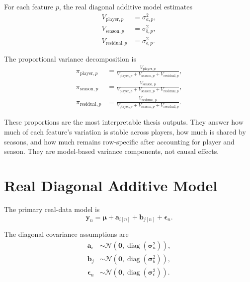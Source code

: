 \documentclass[11pt]{article}
\begin{document}
For each feature \(p\), the real diagonal additive model estimates
\begin{align}
  V_{\mathrm{player},p} &= \sigma_{a,p}^{2}, \\
  V_{\mathrm{season},p} &= \sigma_{b,p}^{2}, \\
  V_{\mathrm{residual},p} &= \sigma_{\epsilon,p}^{2}.
\end{align}

The proportional variance decomposition is
\begin{align}
  \pi_{\mathrm{player},p}
    &= \frac{V_{\mathrm{player},p}}
            {V_{\mathrm{player},p}+V_{\mathrm{season},p}+V_{\mathrm{residual},p}}, \\
  \pi_{\mathrm{season},p}
    &= \frac{V_{\mathrm{season},p}}
            {V_{\mathrm{player},p}+V_{\mathrm{season},p}+V_{\mathrm{residual},p}}, \\
  \pi_{\mathrm{residual},p}
    &= \frac{V_{\mathrm{residual},p}}
            {V_{\mathrm{player},p}+V_{\mathrm{season},p}+V_{\mathrm{residual},p}}.
\end{align}

These proportions are the most interpretable thesis outputs. They answer how
much of each feature's variation is stable across players, how much is shared
by seasons, and how much remains row-specific after accounting for player and
season. They are model-based variance components, not causal effects.

\section{Real Diagonal Additive Model}

The primary real-data model is
\begin{equation}
  \mathbf{y}_n =
  \boldsymbol{\mu} + \mathbf{a}_{i[n]} + \mathbf{b}_{j[n]} +
  \boldsymbol{\epsilon}_n .
  \label{eq:additive}
\end{equation}

The diagonal covariance assumptions are
\begin{align}
  \mathbf{a}_i &\sim \mathcal{N}\!\left(
    \mathbf{0},\operatorname{diag}(\boldsymbol{\sigma}_a^2)\right), \\
  \mathbf{b}_j &\sim \mathcal{N}\!\left(
    \mathbf{0},\operatorname{diag}(\boldsymbol{\sigma}_b^2)\right), \\
  \boldsymbol{\epsilon}_n &\sim \mathcal{N}\!\left(
    \mathbf{0},\operatorname{diag}(\boldsymbol{\sigma}_{\epsilon}^2)\right).
\end{align}
\end{document}
